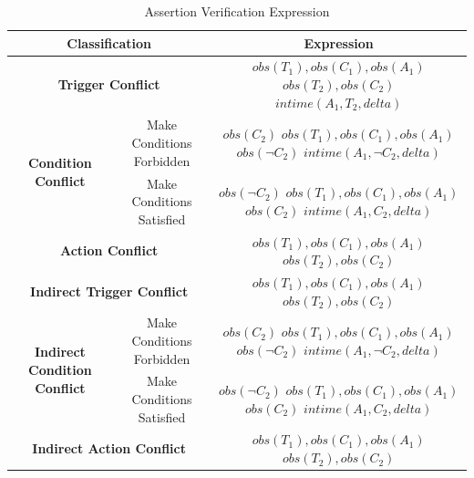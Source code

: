 \begin{table}[t]
	\caption{Assertion Verification Expression}
	\label{Assertion_Verification}
	\begin{adjustbox}{width=0.5\textwidth}
		\begin{tabular}[width=1\textwidth]{c|c|c}
			\hline
			\multicolumn{2}{c|}{\textbf{Classification}} & \textbf{Expression}\\
			\hline
			
			\multicolumn{2}{c|}{\textbf{Trigger Conflict}} &
			\makecell{
				$obs(T_1), obs(C_1), obs(A_1)$ \\
				$obs(T_2), obs(C_2)$ \\
				$intime(A_1, T_2, delta)$}\\
			\hline
			
			\multirow{2}{*}{\textbf{Condition Conflict}} & Make Conditions Forbidden &
			\makecell{$obs(C_2)$ \\
				$obs(T_1), obs(C_1), obs(A_1)$ \\
				$obs(\neg C_2)$ \\
				$intime(A_1, \neg C_2, delta)$} \\
			\cline{2-3}
			& Make Conditions Satisfied &
			\makecell{$obs(\neg C_2)$ \\
				$obs(T_1), obs(C_1), obs(A_1)$ \\
				$obs(C_2)$\\
				$intime(A_1, C_2, delta)$ }\\
			\hline
			
			\multicolumn{2}{c|}{\textbf{Action Conflict}} &
			\makecell{
				$obs(T_1), obs(C_1), obs(A_1)$ 
				\\ $obs(T_2), obs(C_2)$}\\
			\hline
			
			\multicolumn{2}{c|}{\textbf{Indirect Trigger Conflict}} &
			\makecell{$obs(T_1), obs(C_1), obs(A_1)$ \\
				$obs(T_2), obs(C_2)$} \\
			\hline
			
			\multirow{2}{*}{\textbf{Indirect Condition Conflict}} & Make Conditions Forbidden &
			\makecell{$obs(C_2)$ \\
				$obs(T_1), obs(C_1), obs(A_1)$ \\
				$obs(\neg C_2)$  \\
				$intime(A_1, \neg C_2, delta)$ }\\
			\cline{2-3}
			& Make Conditions Satisfied &
			\makecell{$obs(\neg C_2)$ \\
				$obs(T_1), obs(C_1), obs(A_1)$ \\
				$obs(C_2)$ \\
				$intime(A_1,  C_2, delta)$ }\\
			\hline
			
			\multicolumn{2}{c|}{\textbf{Indirect Action Conflict}}&
			\makecell{$obs(T_1), obs(C_1), obs(A_1)$ \\
				$obs(T_2), obs(C_2)$} \\
			\hline
			
		\end{tabular}
	\end{adjustbox}
\end{table}


